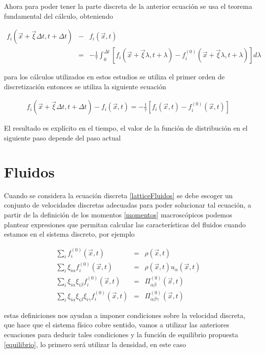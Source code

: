 Ahora para poder tener la parte discreta de la anterior ecuación se usa el teorema fundamental del cálculo, obteniendo 

\begin{eqnarray}
f_{i}(\vec{x}+\vec{\xi}\Delta t, t + \Delta t)&-&f_{i}(\vec{x},t) \nonumber\\
&=&- \frac{1}{\tau}\int_{0}^{\Delta t}[f_{i}(\vec{x}+\vec{\xi}\lambda, t + \lambda)-f_{i}^{(0)}(\vec{x}+\vec{\xi}\lambda, t + \lambda)]d\lambda
\end{eqnarray}

\noindent para los cálculos utilizados en estos estudios se utiliza el primer orden de discretización entonces se utiliza la siguiente ecuación 


\begin{eqnarray}
\label{LBdiscreta}
f_{i}(\vec{x}+\vec{\xi}\Delta t, t + \Delta t)-f_{i}(\vec{x},t)  
=- \frac{1}{\tau}[f_{i}(\vec{x}, t)-f_{i}^{(0)}(\vec{x}, t)]
\end{eqnarray}


El resultado es explícito en el tiempo, el valor de la función de distribución en el siguiente paso depende del paso actual



\section{Fluidos}

Cuando se considera la ecuación discreta \eqref{latticeFluidos} se debe escoger un conjunto de velocidades discretas adecuadas para poder solucionar tal ecuación, a partir de la definición de los momentos \eqref{momentos} macroscópicos podemos plantear expresiones que permitan calcular las características del fluidos cuando estamos en el sistema discreto, por ejemplo 

\begin{eqnarray}
\label{densidad}
\sum_{i}f_{i}^{(0)}(\vec{x},t) &=& \rho(\vec{x},t)\\
\label{momento}
\sum_{i}\xi_{i\alpha}f_{i}^{(0)}(\vec{x},t) &=& \rho(\vec{x},t)u_{\alpha}(\vec{x},t)\\
\label{momento2}
\sum_{i}\xi_{i\alpha}\xi_{i\beta}f_{i}^{(0)}(\vec{x},t) &=& \Pi_{\alpha\beta}^{(0)}(\vec{x},t)\\
\label{momento3}
\sum_{i}\xi_{i\alpha}\xi_{i\beta}\xi_{i\gamma}f_{i}^{(0)}(\vec{x},t) &=& \Pi_{\alpha\beta\gamma}^{(0)}(\vec{x},t)
\end{eqnarray}

\noindent estas definiciones nos ayudan a imponer condiciones sobre la velocidad discreta, que hace que el sistema físico cobre sentido, vamos a utilizar las anteriores ecuaciones para deducir tales condiciones y la función de equilibrio propuesta \eqref{equilibrio}, lo primero será utilizar la densidad, en este caso 

